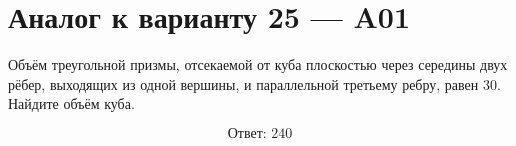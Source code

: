 \documentclass[12pt,a4paper]{article}
\begin{document}
\section*{Аналог к варианту 25 — A01}

Объём треугольной призмы, отсекаемой от куба плоскостью через середины двух рёбер, выходящих из одной вершины, и параллельной третьему ребру, равен \(30\). Найдите объём куба.

\begin{center}
\end{center}

\[
\boxed{\text{Ответ: }240}
\]
\end{document}
